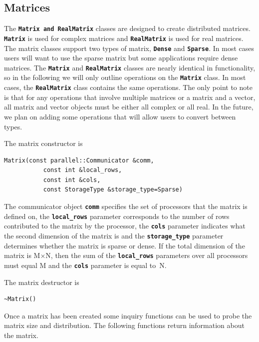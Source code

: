 \documentclass[12pt]{report} %
\begin{document}
\subsection{Matrices}

The \texttt{\textbf{Matrix and RealMatrix}} classes are designed to create distributed matrices. \texttt{\textbf{Matrix}} is used for complex matrices and \texttt{\textbf{RealMatrix}} is used for real matrices. The matrix classes support two types of matrix, \texttt{\textbf{Dense}} and \texttt{\textbf{Sparse}}. In most cases users will want to use the sparse matrix but some applications require dense matrices. The \texttt{\textbf{Matrix}} and \texttt{\textbf{RealMatrix}} classes are nearly identical in functionality, so in the following we will only outline operations on the \texttt{\textbf{Matrix}} class. In most cases, the \texttt{\textbf{RealMatrix}} class contains the same operations. The only point to note is that for any operations that involve multiple matrices or a matrix and a vector, all matrix and vector objects must be either all complex or all real. In the future, we plan on adding some operations that will allow users to convert between types.

The matrix constructor is

{
\color{red}
\begin{Verbatim}[fontseries=b]
Matrix(const parallel::Communicator &comm,
           const int &local_rows,
           const int &cols,
           const StorageType &storage_type=Sparse)
\end{Verbatim}
}

The communicator object \texttt{\textbf{comm}} specifies the set of processors that the matrix is defined on, the \texttt{\textbf{local\_rows}} parameter corresponds to the number of rows contributed to the matrix by the processor, the \texttt{\textbf{cols}} parameter indicates what the second dimension of the matrix is and the \texttt{\textbf{storage\_type}} parameter determines whether the matrix is sparse or dense. If the total dimension of the matrix is M$\mathrm{\times}$N, then the sum of the \texttt{\textbf{local\_rows}} parameters over all processors must equal M and the \texttt{\textbf{cols}} parameter is equal to~N. 

The matrix destructor is

{
\color{red}
\begin{Verbatim}[fontseries=b]
~Matrix()
\end{Verbatim}
}

Once a matrix has been created some inquiry functions can be used to probe the matrix size and distribution. The following functions return information about the matrix.
\end{document}
